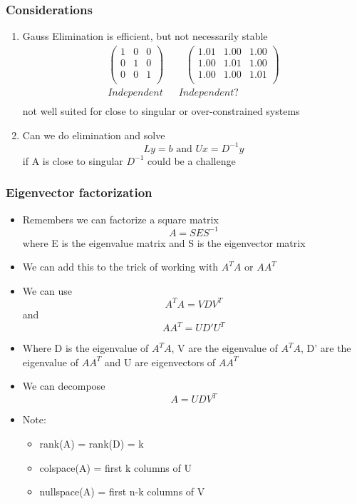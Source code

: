 \documentclass[10pt]{beamer}
\begin{document}
\begin{frame}
  \frametitle{Considerations}
  \begin{enumerate}
  \item Gauss Elimination is efficient, but not necessarily stable
    \[
      \begin{array}{cc}
        \left(
        \begin{array}{ccc}
          1& 0 & 0 \\
          0& 1 & 0 \\
          0 & 0 & 1\\ 
        \end{array}\right) 
        ~~~ & ~~~\left(
        \begin{array}{ccc}
          1.01 & 1.00 & 1.00 \\
          1.00 & 1.01 & 1.00 \\
          1.00 & 1.00 & 1.01 \\ 
        \end{array}\right) \\
        Independent & Independent? \\
      \end{array}
    \]
    not well suited for close to singular or over-constrained systems
  \item Can we do elimination and solve
    \[
      L y = b \mbox{ and } U x = D^{-1} y
    \]
    if A is close to singular $D^{-1}$ could be a challenge
  \end{enumerate}  
\end{frame}

\begin{frame}
  \frametitle{Eigenvector factorization}
  \begin{itemize}
  \item Remembers we can factorize a square matrix
    \[ A = SES^{-1} \]
    where E is the eigenvalue matrix and S is the eigenvector matrix
  \item We can add this to the trick of working with $A^T A$ or $AA^T$ 
  \item We can use
    \[
      A^T A = V D V^T
    \]
    and
    \[
      A A^T = U D' U^T
    \]
    
  \item Where D is the eigenvalue of $A^T A$, V are the eigenvalue of
    $A^T A$, D' are the eigenvalue of $AA^T$ and U are eigenvectors of
    $AA^T$
  \item We can decompose
    \[
      A = U D V^T
    \]
  \item Note:
    \begin{itemize}
    \item rank(A) = rank(D) = k
    \item colspace(A) = first k columns of U
    \item nullspace(A) = first n-k columns of V
    \end{itemize}
  \end{itemize}
\end{frame}
\end{document}
